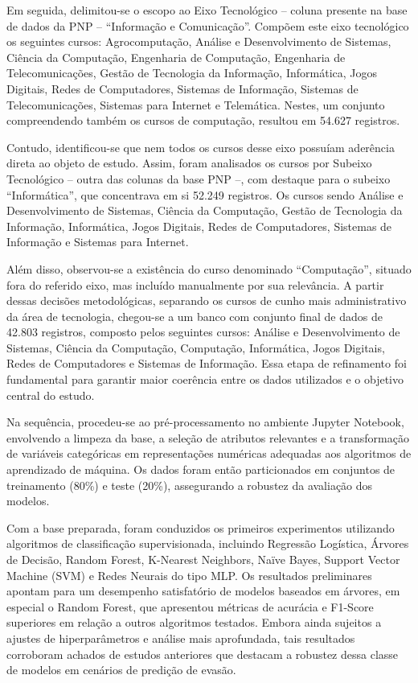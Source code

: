 \documentclass[english, spanish, brazilian]{RBIEarticle} %
\begin{document}
Em seguida, delimitou-se o escopo ao Eixo Tecnológico – coluna presente na base de dados da PNP – “Informação e Comunicação”. Compõem este eixo tecnológico os seguintes cursos: Agrocomputação, Análise e Desenvolvimento de Sistemas, Ciência da Computação, Engenharia de Computação, Engenharia de Telecomunicações, Gestão de Tecnologia da Informação, Informática, Jogos Digitais, Redes de Computadores, Sistemas de Informação, Sistemas de Telecomunicações, Sistemas para Internet e Telemática. Nestes, um conjunto compreendendo também os cursos de computação, resultou em 54.627 registros.

Contudo, identificou-se que nem todos os cursos desse eixo possuíam aderência direta ao objeto de estudo. Assim, foram analisados os cursos por Subeixo Tecnológico – outra das colunas da base PNP –, com destaque para o subeixo “Informática”, que concentrava em si 52.249 registros. Os cursos sendo Análise e Desenvolvimento de Sistemas, Ciência da Computação, Gestão de Tecnologia da Informação, Informática, Jogos Digitais, Redes de Computadores, Sistemas de Informação e Sistemas para Internet.

Além disso, observou-se a existência do curso denominado “Computação”, situado fora do referido eixo, mas incluído manualmente por sua relevância. A partir dessas decisões metodológicas, separando os cursos de cunho mais administrativo da área de tecnologia, chegou-se a um banco com conjunto final de dados de 42.803 registros, composto pelos seguintes cursos: Análise e Desenvolvimento de Sistemas, Ciência da Computação, Computação, Informática, Jogos Digitais, Redes de Computadores e Sistemas de Informação. Essa etapa de refinamento foi fundamental para garantir maior coerência entre os dados utilizados e o objetivo central do estudo.

Na sequência, procedeu-se ao pré-processamento no ambiente Jupyter Notebook, envolvendo a limpeza da base, a seleção de atributos relevantes e a transformação de variáveis categóricas em representações numéricas adequadas aos algoritmos de aprendizado de máquina. Os dados foram então particionados em conjuntos de treinamento (80\%) e teste (20\%), assegurando a robustez da avaliação dos modelos.

Com a base preparada, foram conduzidos os primeiros experimentos utilizando algoritmos de classificação supervisionada, incluindo Regressão Logística, Árvores de Decisão, Random Forest, K-Nearest Neighbors, Naïve Bayes, Support Vector Machine (SVM) e Redes Neurais do tipo MLP. Os resultados preliminares apontam para um desempenho satisfatório de modelos baseados em árvores, em especial o Random Forest, que apresentou métricas de acurácia e F1-Score superiores em relação a outros algoritmos testados. Embora ainda sujeitos a ajustes de hiperparâmetros e análise mais aprofundada, tais resultados corroboram achados de estudos anteriores que destacam a robustez dessa classe de modelos em cenários de predição de evasão.
\end{document}
